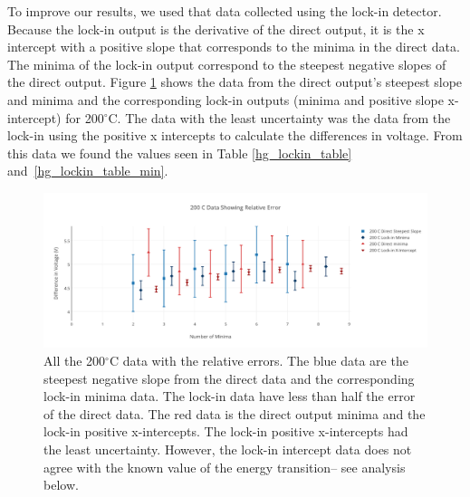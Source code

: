 \documentclass[prb,preprint]{revtex4-1}
\begin{document}
To improve our results, we used that data collected using the lock-in detector. Because the lock-in output is the derivative of the direct output, it is the x intercept with a positive slope that corresponds to the minima in the direct data. The minima of the lock-in output correspond to the steepest negative slopes of the direct output. Figure \ref{rel_error} shows the data from the direct output's steepest slope and minima and the corresponding lock-in outputs (minima and positive slope x-intercept) for 200$^{\circ}$C. The data with the least uncertainty was the data from the lock-in using the positive x intercepts to calculate the differences in voltage. From this data we found the values seen in Table \ref{hg_lockin_table} and~\ref{hg_lockin_table_min}.

\begin{figure}[h!]
\centering

\includegraphics[width=6in]{rel_error.pdf}
\caption{All the 200$^{\circ}$C data with the relative errors. The blue data are the steepest negative slope from the direct data and the corresponding lock-in minima data. The lock-in data have less than half the error of the direct data. The red data is the direct output minima and the lock-in positive x-intercepts. The lock-in positive x-intercepts had the least uncertainty. However, the lock-in intercept data does not agree with the known value of the energy transition-- see analysis below.}

\label{rel_error}
\end{figure}
\end{document}
